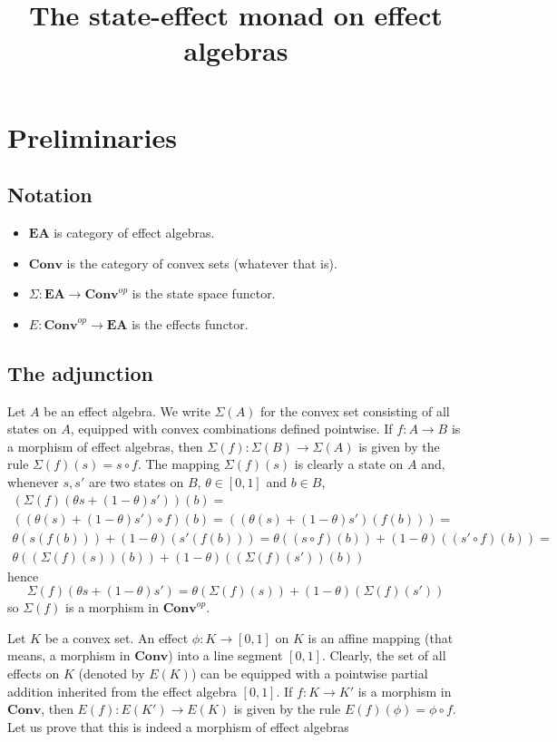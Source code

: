 \documentclass{amsart}
\newcommand{\EA}{\mathbf{EA}}
\newcommand{\Conv}{\mathbf{Conv}}
\newcommand{\Convop}{\mathbf{Conv}^{op}}
\newcommand{\states}{\Sigma}
\newcommand{\effects}{E}
\begin{document}
\title{The state-effect monad on effect algebras}

\section{Preliminaries}
\subsection{Notation}
\begin{itemize}
\item $\EA$ is category of effect algebras.
\item $\Conv$ is the category of convex sets (whatever that is).
\item $\states:\EA\to\Convop$ is the state space functor.
\item $\effects:\Convop\to\EA$ is the effects functor.
\end{itemize}
\subsection{The adjunction}
Let $A$ be an effect algebra. We write $\states(A)$ for the convex set consisting of all states
on $A$, equipped with convex combinations defined pointwise. If $f:A\to B$ is a morphism
of effect algebras, then $\states(f):\states(B)\to\states(A)$ is given by the 
rule $\states(f)(s)=s\circ f$. The mapping $\states(f)(s)$ is clearly a
state on $A$ and, whenever $s,s'$ are two states on $B$, $\theta\in[0,1]$ and $b\in B$,
\begin{align*}
(\states(f)(\theta s+(1-\theta)s'))(b)=\\
((\theta(s)+(1-\theta)s')\circ f)(b)=
((\theta(s)+(1-\theta)s')(f(b)))=\\
\theta(s(f(b)))+(1-\theta)(s'(f(b)))=
\theta((s\circ f)(b))+(1-\theta)((s' \circ f)(b))=\\
\theta((\states(f)(s))(b))+(1-\theta)((\states(f)(s'))(b))
\end{align*}
hence
$$
\states(f)(\theta s+(1-\theta)s')=
\theta(\states(f)(s))+(1-\theta)(\states(f)(s'))
$$
so $\states(f)$ is a morphism in $\Convop$.

Let $K$ be a convex set. An effect $\phi:K\to[0,1]$ on $K$ is an affine mapping 
(that means, a morphism in $\Conv$) into a line segment $[0,1]$. Clearly, the set of all effects on $K$ 
(denoted by $\effects(K)$) can be equipped with a pointwise partial addition inherited from the effect algebra 
$[0,1]$. If $f:K\to K'$ is a morphism in $\Conv$, then $E(f):E(K')\to E(K)$ is given by the rule
$E(f)(\phi)=\phi\circ f$. Let us prove that this is indeed a morphism of effect algebras
\end{document}
